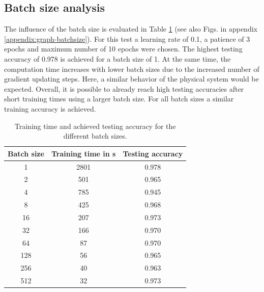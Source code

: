 \subsection{Batch size analysis}
The influence of the batch size is evaluated in Table \ref{tab:batch-size} (see also Figs. in appendix \ref{appendix:graph-batchsize}).
For this test a learning rate of 0.1, a patience of 3 epochs and maximum number of 10 epochs were chosen.
The highest testing accuracy of 0.978 is achieved for a batch size of 1.
At the same time, the computation time increases with lower batch sizes due to the increased number of gradient updating steps. Here, a similar behavior of the physical system would be expected.
Overall, it is possible to already reach high testing accuracies after short training times using a larger batch size. For all batch sizes a similar training accuracy is achieved.
\begin{table}[H]
    \centering
    \caption{Training time and achieved testing accuracy for the different batch sizes.}
    \begin{tabular}{|c|c|c|}
    \hline
    Batch size & Training time in s & Testing accuracy\\
    \hline
        1 & 2801 & 0.978\\
        2 & 501 & 0.965\\
        4 & 785 & 0.945\\
        8 & 425 & 0.968\\
        16 & 207 & 0.973\\
        32 & 166 & 0.970\\
        64 & 87 & 0.970\\
        128 & 56 & 0.965\\
        256 & 40 & 0.963\\
        512 & 32 & 0.973\\
    \hline
    \end{tabular}
    \label{tab:batch-size}
\end{table}

